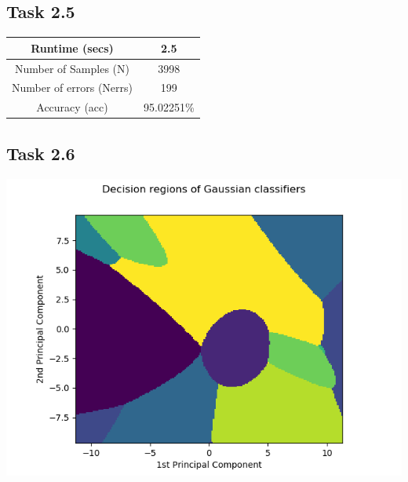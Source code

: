 \documentclass{article}
\begin{document}

\subsection*{Task 2.5}

\begin{tabular}{ |c|c| } 
 \hline
 Runtime (secs) & 2.5 \\
 \hline
 Number of Samples (N) & 3998 \\
 \hline
 Number of errors (Nerrs) & 199 \\
 \hline
 Accuracy (acc) & 95.02251\% \\
 \hline
\end{tabular}

\newpage
\subsection*{Task 2.6}

\begin{center}
    \includegraphics[trim=0 0 0 0, scale=0.6]{images/task2_6_img.png}
\end{center}
\end{document}
